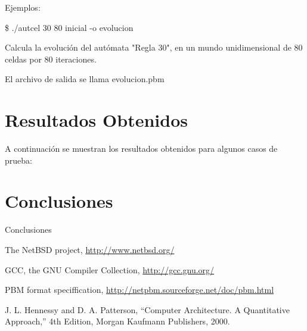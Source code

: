 \documentclass[9pt,a4paper]{article}
\begin{document}
Ejemplos: 
\par
{\ttfamily\footnotesize
\$ ./autcel 30 80 inicial -o evolucion}
\par
Calcula la evolución del autómata "Regla 30", en un mundo unidimensional de 80 celdas por 80 iteraciones.
\par
El archivo de salida se llama evolucion.pbm
\bigskip

\section{Resultados Obtenidos}

A continuación se muestran los resultados obtenidos para algunos casos de prueba:
\par


\section{Conclusiones}

Conclusiones

\bigskip

\newpage
\begin{thebibliography}{99}
 The NetBSD project, \url{http://www.netbsd.org/}

 GCC, the GNU Compiler Collection, \url{http://gcc.gnu.org/}

 PBM format speciffication, \url{http://netpbm.sourceforge.net/doc/pbm.html}

 J. L. Hennessy and D. A. Patterson, ``Computer Architecture. A Quantitative
Approach,'' 4th Edition, Morgan Kaufmann Publishers, 2000.

\end{thebibliography}
\end{document}
